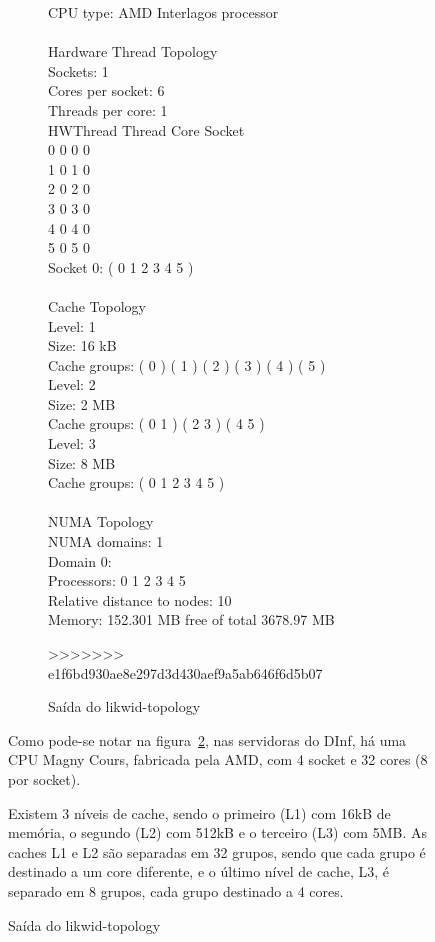 \documentclass[12pt]{article}
\begin{document}
\begin{figure}[ht]
\begin{figure}[ht]
\begin{tt}\noindent
CPU type:   AMD Interlagos processor \\
\\
Hardware Thread Topology\\
Sockets:    1 \\
Cores per socket:   6 \\
Threads per core:   1 \\
HWThread    Thread      Core        Socket\\
0       0       0       0\\
1       0       1       0\\
2       0       2       0\\
3       0       3       0\\
4       0       4       0\\
5       0       5       0\\
Socket 0: ( 0 1 2 3 4 5 )\\
\\
Cache Topology\\
Level:  1\\
Size:   16 kB\\
Cache groups:   ( 0 ) ( 1 ) ( 2 ) ( 3 ) ( 4 ) ( 5 )\\
Level:  2\\
Size:   2 MB\\
Cache groups:   ( 0 1 ) ( 2 3 ) ( 4 5 )\\
Level:  3\\
Size:   8 MB\\
Cache groups:   ( 0 1 2 3 4 5 )\\
\\
NUMA Topology\\
NUMA domains: 1 \\
Domain 0:\\
Processors:  0 1 2 3 4 5\\
Relative distance to nodes:  10\\
Memory: 152.301 MB free of total 3678.97 MB\\
\end{tt}\caption{Saída do likwid-topology}\label{fig:topologyOut}
>>>>>>> e1f6bd930ae8e297d3d430aef9a5ab646f6d5b07
\end{figure}

Como pode-se notar na figura~\ref{fig:topologyOut}, nas servidoras do DInf, há
uma CPU Magny Cours, fabricada pela AMD, com 4 socket e 32 cores (8 por socket).

Existem 3 níveis de cache, sendo o primeiro (L1) com 16kB de memória, o segundo
(L2) com 512kB e o terceiro (L3) com 5MB. As caches L1 e L2 são separadas em 32
grupos, sendo que cada grupo é destinado a um core diferente, e o último nível
de cache, L3, é separado em 8 grupos, cada grupo destinado a 4 cores.


\end{figure}
\end{document}
